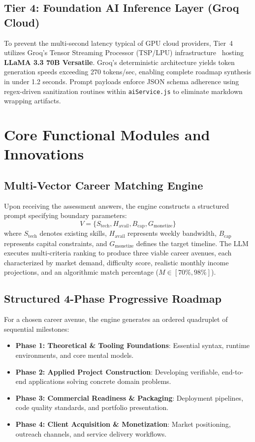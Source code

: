\documentclass[conference]{IEEEtran}
\begin{document}
\subsection{Tier 4: Foundation AI Inference Layer (Groq Cloud)}
To prevent the multi-second latency typical of GPU cloud providers, Tier~4 utilizes Groq's Tensor Streaming Processor (TSP/LPU) infrastructure~\cite{groq2022tpu} hosting \textbf{LLaMA 3.3 70B Versatile}. Groq's deterministic architecture yields token generation speeds exceeding 270 tokens/sec, enabling complete roadmap synthesis in under 1.2 seconds. Prompt payloads enforce JSON schema adherence using regex-driven sanitization routines within \texttt{aiService.js} to eliminate markdown wrapping artifacts.

\section{Core Functional Modules and Innovations}

\subsection{Multi-Vector Career Matching Engine}
Upon receiving the assessment answers, the engine constructs a structured prompt specifying boundary parameters:
$$V = \{ S_{\text{tech}}, H_{\text{avail}}, B_{\text{cap}}, G_{\text{monetize}} \}$$
where $S_{\text{tech}}$ denotes existing skills, $H_{\text{avail}}$ represents weekly bandwidth, $B_{\text{cap}}$ represents capital constraints, and $G_{\text{monetize}}$ defines the target timeline. The LLM executes multi-criteria ranking to produce three viable career avenues, each characterized by market demand, difficulty score, realistic monthly income projections, and an algorithmic match percentage ($M \in [70\%, 98\%]$).

\subsection{Structured 4-Phase Progressive Roadmap}
For a chosen career avenue, the engine generates an ordered quadruplet of sequential milestones:
\begin{itemize}
    \item \textbf{Phase 1: Theoretical \& Tooling Foundations}: Essential syntax, runtime environments, and core mental models.
    \item \textbf{Phase 2: Applied Project Construction}: Developing verifiable, end-to-end applications solving concrete domain problems.
    \item \textbf{Phase 3: Commercial Readiness \& Packaging}: Deployment pipelines, code quality standards, and portfolio presentation.
    \item \textbf{Phase 4: Client Acquisition \& Monetization}: Market positioning, outreach channels, and service delivery workflows.
\end{itemize}
\end{document}
